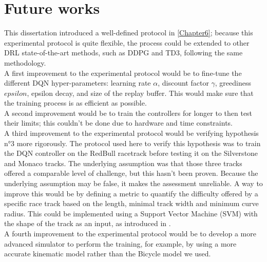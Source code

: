 \section{Future works}
This dissertation introduced a well-defined protocol in \ref{Chapter6}; because this 
experimental protocol is quite flexible, the process could be extended to other DRL state-of-the-art methods, such as DDPG and TD3, following the same methodology. \\
A first improvement to the experimental protocol would be to fine-tune the different DQN hyper-parameters: learning rate $\alpha$, discount factor $\gamma$, greediness $epsilon$, epsilon decay, and size of the replay buffer. This would make sure that the training process is as efficient as possible. \\
A second improvement would be to train the controllers for longer to then test their limits; this couldn't be done due to hardware and time constraints. \\
A third improvement to the experimental protocol would be verifying hypothesis n°3 more rigorously. The protocol used here to verify this hypothesis was to train the DQN controller on the RedBull racetrack before testing it on the Silverstone and Monaco tracks. The underlying assumption was that those three tracks offered a comparable level of challenge, but this hasn't been proven. Because the underlying assumption may be false, it makes the assessment unreliable. A way to improve this would be by defining a metric to quantify the difficulty offered by a specific race track based on the length, minimal track width and minimum curve radius. This could be implemented using a Support Vector Machine (SVM) with the shape of the track as an input, as introduced in \cite{futurework}.\\
A fourth improvement to the experimental protocol would be to develop a more advanced simulator to perform the training, for example, by using a more accurate kinematic model rather than the Bicycle model we used.